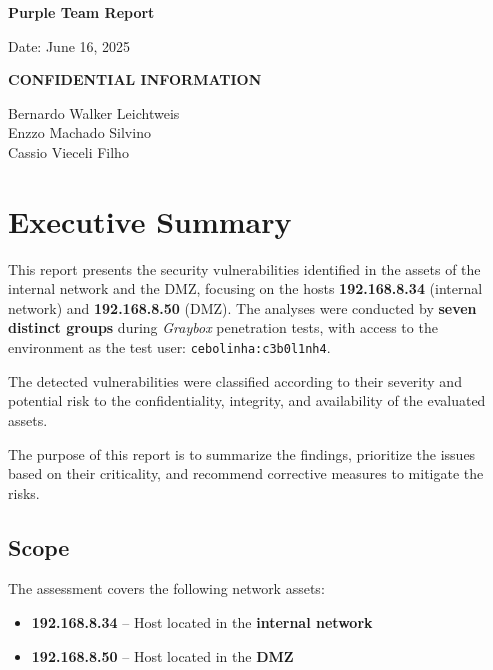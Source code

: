 \documentclass[a4paper,12pt]{article}
\begin{document}
\begin{titlepage}
    \centering
    \vspace*{2cm}
    {\Huge\bfseries Purple Team Report\par}
    \vspace{1cm}
    {\Large Date: June 16, 2025\par}
    \vspace{0.5cm}
    {\large\bfseries CONFIDENTIAL INFORMATION\par}
    \vspace{2cm}
    {\large Bernardo Walker Leichtweis \\ Enzzo Machado Silvino \\ Cassio Vieceli Filho\par}
\end{titlepage}

\tableofcontents
\clearpage

\section{Executive Summary}

This report presents the security vulnerabilities identified in the assets of the internal network and the DMZ, focusing on the hosts \textbf{192.168.8.34} (internal network) and \textbf{192.168.8.50} (DMZ). The analyses were conducted by \textbf{seven distinct groups} during \textit{Graybox} penetration tests, with access to the environment as the test user: \texttt{cebolinha:c3b0l1nh4}.

The detected vulnerabilities were classified according to their severity and potential risk to the confidentiality, integrity, and availability of the evaluated assets.

The purpose of this report is to summarize the findings, prioritize the issues based on their criticality, and recommend corrective measures to mitigate the risks.

\subsection{Scope}

The assessment covers the following network assets:

\begin{itemize}
    \item \textbf{192.168.8.34} -- Host located in the \textbf{internal network}
    \item \textbf{192.168.8.50} -- Host located in the \textbf{DMZ}
\end{itemize}
\end{document}
